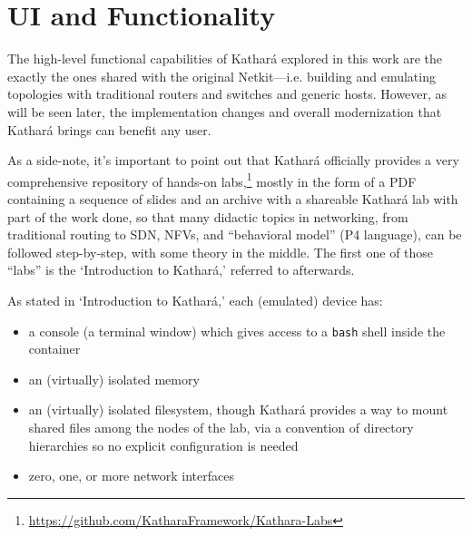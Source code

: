 \section{UI and Functionality}
\label{sec:katharafunctionality}


The high-level functional capabilities of Kathará explored in this work are the exactly the ones shared with the original Netkit---i.e. building and emulating topologies with traditional routers and switches and generic hosts.
However, as will be seen later, the implementation changes and overall modernization that Kathará brings can benefit any user.

As a side-note, it's important to point out that Kathará officially provides a very comprehensive repository of hands-on labs,\footnote{\mbox{\url{https://github.com/KatharaFramework/Kathara-Labs}}} mostly in the form of a PDF containing a sequence of slides and an archive with a shareable Kathará lab with part of the work done, so that many didactic topics in networking, from traditional routing to SDN, NFVs, and ``behavioral model'' (P4 language), can be followed step-by-step, with some theory in the middle.
The first one of those ``labs'' is the `Introduction to Kathará,' referred to afterwards.



As stated in `Introduction to Kathará,' each (emulated) device has:
\begin{itemize}
  \item a console (a terminal window) which gives access to a \texttt{bash} shell inside the container
  \item an (virtually) isolated memory
  \item an (virtually) isolated filesystem, though Kathará provides a way to mount shared files among the nodes of the lab, via a convention of directory hierarchies so no explicit configuration is needed
  \item zero, one, or more network interfaces
\end{itemize}

